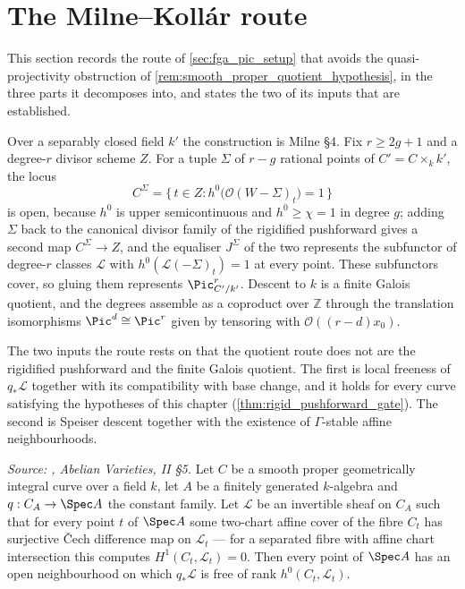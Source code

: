 \section{The Milne--Koll\'ar route}
\label{sec:fga_pic_milne_kollar}

This section records the route of \cref{sec:fga_pic_setup} that avoids the
quasi-projectivity obstruction of \cref{rem:smooth_proper_quotient_hypothesis},
in the three parts it decomposes into, and states the two of its inputs that are
established.

Over a separably closed field \(k'\) the construction is Milne \S 4. Fix
\(r \ge 2g+1\) and a degree-\(r\) divisor scheme \(Z\). For a tuple \(\Sigma\) of
\(r-g\) rational points of \(C' = C \times_k k'\), the locus
\[
  C^\Sigma
    = \{\, t \in Z : h^0\bigl(\mathcal{O}(W - \Sigma)_t\bigr) = 1 \,\}
\]
is open, because \(h^0\) is upper semicontinuous and \(h^0 \ge \chi = 1\) in
degree \(g\); adding \(\Sigma\) back to the canonical divisor family of the
rigidified pushforward gives a second map \(C^\Sigma \to Z\), and the equaliser
\(J^\Sigma\) of the two represents the subfunctor of degree-\(r\) classes
\(\mathcal{L}\) with \(h^0(\mathcal{L}(-\Sigma)_t) = 1\) at every point. These
subfunctors cover, so gluing them represents \(\Pic^r_{C'/k'}\). Descent to
\(k\) is a finite Galois quotient, and the degrees assemble as a coproduct over
\(\mathbb{Z}\) through the translation isomorphisms
\(\Pic^d \cong \Pic^r\) given by tensoring with \(\mathcal{O}((r-d) x_0)\).

The two inputs the route rests on that the quotient route does not are the
rigidified pushforward and the finite Galois quotient. The first is local freeness
of \(q_* \mathcal{L}\) together with its compatibility with base change, and it
holds for every curve satisfying the hypotheses of this chapter
(\cref{thm:rigid_pushforward_gate}). The second is Speiser descent together with
the existence of \(\Gamma\)-stable affine neighbourhoods.

\begin{theorem}\leanok
  \label{thm:rigid_pushforward_locally_free}
  \textit{Source: \cite{mumford-av}, \emph{Abelian Varieties}, II \S 5.}
  Let \(C\) be a smooth proper geometrically integral curve over a field \(k\),
  let \(A\) be a finitely generated \(k\)-algebra and \(q : C_A \to \Spec A\) the
  constant family. Let \(\mathcal{L}\) be an invertible sheaf on \(C_A\) such that
  for every point \(t\) of \(\Spec A\) some two-chart affine cover of the fibre
  \(C_t\) has surjective {\v C}ech difference map on \(\mathcal{L}_t\) --- for a
  separated fibre with affine chart intersection this computes
  \(H^1(C_t, \mathcal{L}_t) = 0\). Then every point of \(\Spec A\) has an open
  neighbourhood on which \(q_* \mathcal{L}\) is free of rank
  \(h^0(C_t, \mathcal{L}_t)\).
\end{theorem}

